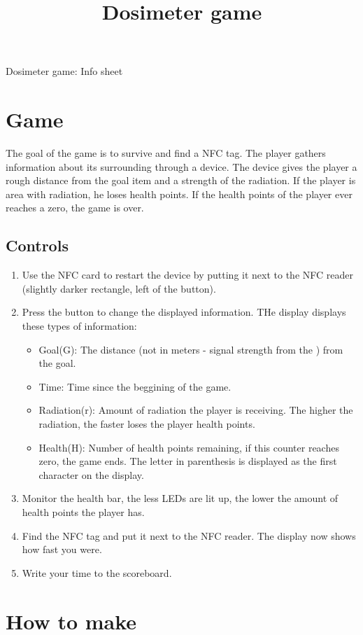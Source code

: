 \documentclass{article}
\title{Dosimeter game}
\begin{document}
\vspace*{10px}
{\huge{Dosimeter game: Info sheet}}

\section{Game}
The goal of the game is to survive and find a NFC tag. 
The player gathers information about its surrounding through a device.
The device gives the player a rough distance from the goal item and a strength of the radiation.
If the player is area with radiation, he loses health points.
If the health points of the player ever reaches a zero, the game is over.

\subsection{Controls}
\begin{enumerate}
\item Use the NFC card to restart the device by putting it next to the NFC reader (slightly darker rectangle, left of the button).
\item Press the button to change the displayed information. THe display displays these types of information:
\begin{itemize}
\item Goal(G): The distance (not in meters - signal strength from the ) from the goal.
\item Time: Time since the beggining of the game.
\item Radiation(r): Amount of radiation the player is receiving. The higher the radiation, the faster loses the player health points. 
\item Health(H): Number of health points remaining, if this counter reaches zero, the game ends.
The letter in parenthesis is displayed as the first character on the display.
\end{itemize}
\item Monitor the health bar, the less LEDs are lit up, the lower the amount of health points the player has.
\item Find the NFC tag and put it next to the NFC reader. The display now shows how fast you were.
\item Write your time to the scoreboard.
\end{enumerate}

\section{How to make}
\end{document}
